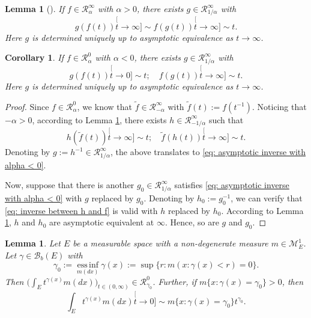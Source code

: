 \documentclass[12pt, a4paper]{amsart}
\newtheorem{lem}[thm]{Lemma}
\newtheorem{cro}[thm]{Corollary}
\theoremstyle{definition}
\numberwithin{equation}{section}
\begin{document}
\begin{lem}[{\cite[Theorem 1.5.12]{BinghamGoldieTeugels1989Regular}}] \label{lem: regularly variation and inverse}
	If $f \in \mathcal R_\alpha^\infty$ with $\alpha > 0$, there exists $g \in \mathcal R^\infty_{1/\alpha}$ with
\begin{equation}
	g(f(t))
	\stackrel[t\to \infty]{}{\sim}
	f(g(t))
	\stackrel[t\to \infty]{}{\sim}
	t.
\end{equation}
	Here $g$ is determined uniquely up to asymptotic equivalence as $t\to \infty$.
\end{lem}
\begin{cro} \label{cro: regularly varing and inverse with alpha < 0}
	If $f \in \mathcal R_\alpha^0$ with $\alpha < 0$, there exists $g \in \mathcal R^\infty_{1/\alpha}$ with
\begin{equation} \label{eq: asymptotic inverse with alpha < 0}
	g(f(t))
	\stackrel[t\to 0]{}{\sim}
	t;
	\quad
	f(g(t))
	\stackrel[t\to \infty]{}{\sim}
	t.
\end{equation}
	Here $g$ is determined uniquely up to asymptotic equivalence as $t\to \infty$.
\end{cro}
\begin{proof}
	Since $f \in \mathcal R_\alpha^0$, we know that $\tilde f \in \mathcal R_{-\alpha}^\infty$ with $\tilde f(t):= f(t^{-1})$. 
	Noticing that $-\alpha > 0$, according to Lemma \ref{lem: regularly variation and inverse}, there exists $h \in \mathcal R_{-1/\alpha}^{\infty}$ such that
\begin{equation} \label{eq: inverse between h and f}
	h(\tilde f(t))
	\stackrel[t\to \infty]{}{\sim}
	t;
	\quad
	\tilde f(h(t))
	\stackrel[t\to \infty]{}{\sim}
	t.
\end{equation}
	Denoting by $g := h^{-1} \in \mathcal R_{1/\alpha}^\infty$, the above translates to \eqref{eq: asymptotic inverse with alpha < 0}.

	Now, suppose that there is another $g_0 \in \mathcal R_{1/\alpha}^\infty$ satisfies \eqref{eq: asymptotic inverse with alpha < 0} with $g$ replaced by $g_0$.
	Denoting by $h_0 := g_0^{-1}$, we can verify that \eqref{eq: inverse between h and f} is valid with $h$ replaced by $h_0$.
	According to Lemma \ref{lem: regularly variation and inverse}, $h$ and $h_0$ are asymptotic equivalent at $\infty$. 
	Hence, so are $g$ and $g_0$.
\end{proof}
\begin{lem}\label{lem:regularly_variation_and_integration}
	Let $E$ be a measurable space with a non-degenerate measure $m \in \mathcal M^1_E$.
	Let $ \gamma \in \mathscr B_b(E)$ with
\begin{equation}
	\gamma_0
	:= \operatorname*{ess\,inf}_{m(dx)} \gamma(x)
	:= \sup\{r:m(x:\gamma(x) < r) = 0\}.
\end{equation}
	Then $\big(\int_E t^{\gamma(x)} m(dx)\big)_{t\in (0,\infty)} \in \mathcal R^0_{\gamma_0}$.
	Further, if $m\{x:\gamma(x) = \gamma_0\}>0$, then
\begin{equation}
	\int_E t^{\gamma(x)} m(dx)
	\stackrel[t\to 0]{}{\sim}  m\{x:\gamma(x) = \gamma_0\} t^{\gamma_0}.
\end{equation}
\end{lem}
\end{document}
